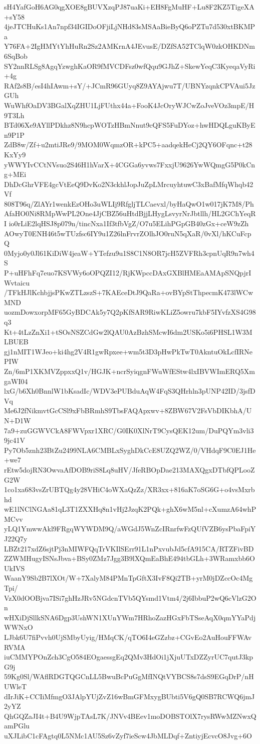 sH4YafGoH6AG0qgXOE8gBUVXzqPJ87uaKi+EH8FgMuHF+Lu8F2KZ5TigeXA+sY58
4jeJTCHuKs1An7npf34IGIDoOFjiLjNHd83sMSAaBieByQ6oPZTu7d530xtBKMPa
Y76FA+2IgHMYtYhHuRn2Sz2AMKrnA4JEvusE/DZfSA52TClqW0zkOHKDNm6SqBob
SY2nnRLSg8AgqYzwghKaOR9fMVCDFsz0wfQqu9GJhZ+SkewYeqC3KyeqaVyRi+4g
RAf2s8B/esI4hIAwm+sY/+JCmR96GUyq8Z9AYAjwu7T/UBNYzqnkCPVAui5JzGUh
WuWhfOaDV3BGalXqZHU1LjFUthx44a+FooK4JcOryWJCwZoJveVOz3mpE/H9T3Lh
BTd06Xe9AYllPDkhz8N9hcpWOTzHBmNnut9cQFS5FuDYoz+hwHDQLguKByEn9P1P
ZdB8w/Zf+u2mtiJRe9/9MOM0WqmzOR+kPC5+aadqekHeCj2QY6OFqnc+t28KxYy9
yWWYIvCCtNVsuo2S46H1hVarX+4CGGa6yvws7FxxjU9626YwWQmgG5P0kCng+MEi
DhDcGhrVFE4gcVtEeQ9DvKo2N3ckhlJopJuZpLMrcuyhtuwC3xBafMfqWhqb42Vf
808T96q/ZlAYr1wenkEzOHo3uWLIj9RfgljTLCaevxl/byHaQwO1w017jK7M8/Ph
AfaHO0Ni8RMpWwPL2One4JjCBZ56uHtdBjjLHygLsvyrNrJbtllh/HL2GChYeqRI
io0rLiE2lqHSJ8p079n/tincNxa1If3tfbVgZ/O7u5ELihPGpGB40zGx+ceW9zZh
AOwyT0ENH46t5wTUzfsc6IY9u1Z26lnFrvrZOlhJO0ruN5qXaR/0vXl/hKCuFcpQ
0Myjo0y0Jl61KiDiW4jeaW+YTefzu9u1S8C1N8OR7jcH5ZVFRh3cpnUqR9n7wh4S
P+uHFhFq7euo7KSVWy6oOPQZI12/RjKWpccDAxGXBlHMEaAMApSNQpjrIWvtaicu
/TFkHJlKchbjjsPKwZTLzszS+7KAEceDtJ9QaRa+ovBYpStThpecmK473lWCwMND
uozmDowxorpMF65GyBDCAk5y7Q2pKfSAR9RiwKLiZ5owru7kbF5IYvfzXS4G98q3
Kt+4tLzZnXi1+tSOsNSZCdGw2lQAU0AzBzhSMcwI6dm2USKo5i6PHSL1W3MLBUEB
gj1nMIT1WJeo+ki4hg2V4R1gwRpxee+wm5t3D3pHwPkTwT0AkntuOkLcfIRNePIW
Zn/6mP1XKMVZppxxQ1v/HGJK+ncrSyiqgnFWuWfEStw4lxIBVWImERQ5XmgaWI04
lxG/b6Xh0BnnlW1bKsadIc/WDV3ePUBduAqW4FqS3QHrhln3pUNP42ID/3jsfDVq
Me6J2fNikmvtGcCSl9xFbBRmhS9TbsFAQApxwv+8ZBW67V2FsVbDIKbhA/UN+D1W
7a9+zuGGWVCkA8FWVpxr1XRC/G0IK0XlNrT9CysQEK12um/DuPQYm3vli39jc41V
Py7Ob5znh23BtZu2499NLA6CMBLxSyghDkCcE8UZQ2WZ/0/VHdqF9C0EJ1He+we7
rEtw5dojRN3OwvaAfDOB9riS8Lq8uHV/JfeRBOpDae213MAXQgxDTbfQPLooZG2W
1co1xa683vsZrUBTQg4y28VHiC4oWXaQzZz/XR3xx+816aK7oSG6G+o4vsMxrbhd
wE1lNClNGAa81qL3T1ZXXHq8n1vHj2JzqK2PQk+ghX6wM5nl+cXumzA64whPMCvv
yLQ1YmwwAkl9FRgqWYWDM9Q/aWGdJ5WnZcIRnrfwFzQUfVZB6ysPbaFpiYJ22Q7y
LBZt217xdZ6sjtPj3nMIWFQqTrVKIlSErr91L1nPxvubJd5cfA915CA/RTZFivBD
ZZWMHugyISNsJbva+BSy0ZMz7Jgg3B9lXQmEaBhE494tbGLh+3WRamxbb6OUkIVS
WaanY9Sb2B7lXOt/W+7XalyM84PMnTpGftX3IvF8Qi2TB+yrM0jDZccOc4MgTpi/
VzX0dOOBjva7ISi7ghHzJRv5NGdcnTVb5QYsmd1Vtm4/2j6IbbuP2wQ6cVlzG2On
wHXiDjSllkSNA6Dgp3UshWN1XUnYWm7HRhoZazHGxFbTSseAqX0qmYYaPdjWWNxO
LJbk6U7fiPvvh0UjSMbyUyig/HMqCK/qTO6I4eGZzbz+CGvEo2AuHouFFWAvRVMA
iuCMMYPOnZch3CgO584EOgaessgEq2QMv3HdOi1jXjuUTxDZZyrUC7qutJ3kpG9j
59Kg0Sl/WAflRDGTQGCnLL5BwuBcPuGgMfINQtVYBCS8s7dsS9EGqDrP/nHUWleT
dIrJiK+CCIiMfmgO3JAlpYUjZvZ16wBmGFMxygBUbti5V6gQ0SB7RCWQ6jmJ2yYZ
QhGQZaJI4t+B4U9WjpTAsL7K/JNVv4BEev1moDOBSTOlX7rysRWwMZNwxQamPGlu
uXJLibC1cFAgtq0L5NMc1AU5Sz6vZyf7ieScw4JbMLDqf+ZntiyjEcvcO8Jvg+6O
